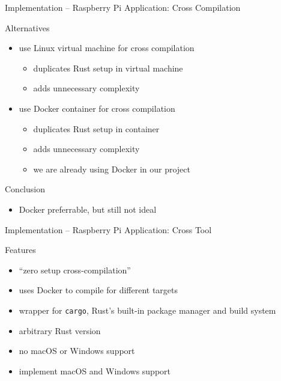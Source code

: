 \begin{frame}{Implementation -- Raspberry Pi Application: Cross Compilation}
  \begin{block}{Alternatives}
    \begin{itemize}
      \item use Linux virtual machine for cross compilation
      \begin{itemize}
        \item {} duplicates Rust setup in virtual machine
        \item {} adds unnecessary complexity
      \end{itemize}
      \item use Docker container for cross compilation
      \begin{itemize}
        \item {} duplicates Rust setup in container
        \item {} adds unnecessary complexity
        \item {} we are already using Docker in our project
      \end{itemize}
    \end{itemize}
  \end{block}

  \begin{block}{Conclusion}
    \begin{itemize}
      \item Docker preferrable, but still not ideal
    \end{itemize}
  \end{block}
\end{frame}

\begin{frame}{Implementation -- Raspberry Pi Application: Cross Tool}
  \begin{block}{Features}
    \begin{itemize}
      \item “zero setup cross-compilation”
      \item uses Docker to compile for different targets
      \item wrapper for \texttt{cargo}, Rust's built-in package manager and build system
      \item arbitrary Rust version
    \end{itemize}
  \end{block}

  \begin{block}{}
    \begin{itemize}
      \item no macOS or Windows support
    \end{itemize}
  \end{block}

  \begin{block}{}
    \begin{itemize}
      \item implement macOS and Windows support
    \end{itemize}
  \end{block}
\end{frame}

